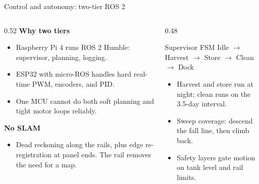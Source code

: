 \documentclass[aspectratio=169,10pt]{beamer}
\begin{document}
\begin{frame}{Control and autonomy: two-tier ROS 2}
  \begin{columns}[T]
    \begin{column}{0.52\textwidth}
      \textbf{Why two tiers}
      \begin{itemize}\small\setlength\itemsep{0.3em}
        \item Raspberry Pi 4 runs ROS 2 Humble: supervisor, planning, logging.
        \item ESP32 with micro-ROS handles hard real-time PWM, encoders, and PID.
        \item One MCU cannot do both soft planning and tight motor loops reliably.
      \end{itemize}
      \vspace{0.3em}
      \textbf{No SLAM}
      \begin{itemize}\small\setlength\itemsep{0.3em}
        \item Dead reckoning along the rails, plus edge re-registration at panel ends. The rail removes the need for a map.
      \end{itemize}
    \end{column}
    \begin{column}{0.48\textwidth}
      \begin{block}{Supervisor FSM}
        \centering
        Idle $\rightarrow$ Harvest $\rightarrow$ Store $\rightarrow$ Clean $\rightarrow$ Dock
      \end{block}
      \begin{itemize}\small\setlength\itemsep{0.3em}
        \item Harvest and store run at night; clean runs on the 3.5-day interval.
        \item Sweep coverage: descend the fall line, then climb back.
        \item Safety layers gate motion on tank level and rail limits.
      \end{itemize}
    \end{column}
  \end{columns}
\end{frame}
\end{document}
